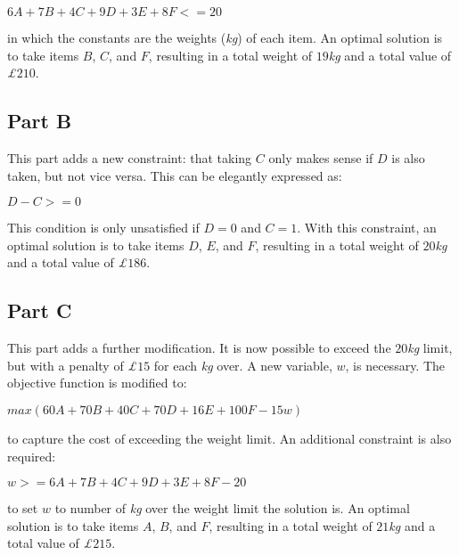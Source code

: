 \documentclass[11pt]{article} %
\begin{document}
\begin{center}

$6A + 7B + 4C + 9D + 3E + 8F <= 20$

\end{center}

in which the constants are the weights (\textit{kg}) of each item. An optimal solution is to take items $B$, $C$, and $F$, resulting in a total weight of $19$\textit{kg} and a total value of \textit{£}$210$.

\subsection*{Part B}

This part adds a new constraint:  that taking $C$ only makes sense if $D$ is also taken, but not vice versa. This can be elegantly expressed as:

\begin{center}

$D - C >= 0$

\end{center}

This condition is only unsatisfied if $D = 0$ and $C = 1$. With this constraint, an optimal solution is to take items $D$, $E$, and $F$, resulting in a total weight of $20$\textit{kg} and a total value of \textit{£}$186$.

\subsection*{Part C}

This part adds a further modification. It is now possible to exceed the $20$\textit{kg} limit, but with a penalty of \textit{£}$15$ for each \textit{kg} over. A new variable, $w$, is necessary. The objective function is modified to:

\begin{center}

$max (60A + 70B + 40C + 70D + 16E + 100F - 15w)$

\end{center}

to capture the cost of exceeding the weight limit. An additional constraint is also required:

\begin{center}

$w >= 6A + 7B + 4C + 9D + 3E + 8F - 20$

\end{center}

to set $w$ to number of \textit{kg} over the weight limit the solution is.
An optimal solution is to take items $A$, $B$, and $F$, resulting in a total weight of $21$\textit{kg} and a total value of \textit{£}$215$.
\end{document}
